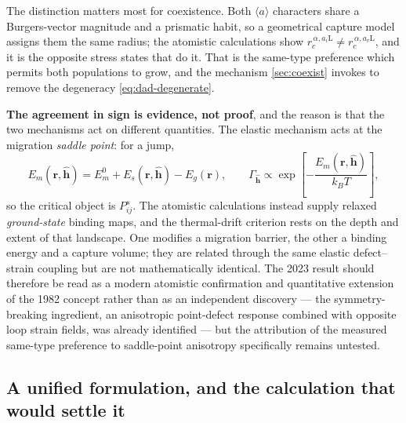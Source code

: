 \documentclass{article}
\newcommand{\aloop}{\ensuremath{\langle a\rangle}}
\newcommand{\aiL}{a_{i}\mathrm{L}}
\newcommand{\avL}{a_{v}\mathrm{L}}
\begin{document}
The distinction matters most for coexistence. Both \aloop{} characters share a
Burgers-vector magnitude and a prismatic habit, so a geometrical capture model
assigns them the same radius; the atomistic calculations show
$r_c^{\,\alpha,\aiL}\neq r_c^{\,\alpha,\avL}$, and it is the opposite stress
states that do it. That is the same-type preference which permits both
populations to grow, and the mechanism \cref{sec:coexist} invokes to remove the
degeneracy \cref{eq:dad-degenerate}.

\textbf{The agreement in sign is evidence, not proof}, and the reason is that the
two mechanisms act on different quantities. The elastic mechanism acts at the
migration \emph{saddle point}: for a jump,
\begin{equation}
    E_m(\bm r,\hat{\bm h})=E_m^0+E_s(\bm r,\hat{\bm h})-E_g(\bm r),
    \qquad
    \Gamma_{\hat{\bm h}}\propto
    \exp\!\left[-\frac{E_m(\bm r,\hat{\bm h})}{k_BT}\right],
    \label{eq:saddle_jump_rate}
\end{equation}
so the critical object is $P^s_{ij}$. The atomistic calculations instead supply
relaxed \emph{ground-state} binding maps, and the thermal-drift criterion rests
on the depth and extent of that landscape. One modifies a migration barrier, the
other a binding energy and a capture volume; they are related through the same
elastic defect--strain coupling but are not mathematically identical. The 2023
result should therefore be read as a modern atomistic confirmation and
quantitative extension of the 1982 concept rather than as an independent
discovery --- the symmetry-breaking ingredient, an anisotropic point-defect
response combined with opposite loop strain fields, was already identified --- but
the attribution of the measured same-type preference to saddle-point anisotropy
specifically remains untested.

\subsection{A unified formulation, and the calculation that would settle it}
\end{document}

